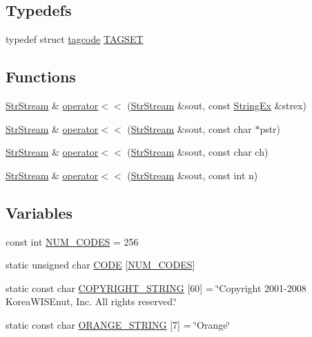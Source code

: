 \subsection*{Typedefs}
\begin{CompactItemize}
\item 
typedef struct \hyperlink{structkmaOrange_1_1tagcode}{tagcode} \hyperlink{namespacekmaOrange_230797a4305d0e6ffe336733f420995a}{TAGSET}
\end{CompactItemize}
\subsection*{Functions}
\begin{CompactItemize}
\item 
\hyperlink{classkmaOrange_1_1StrStream}{StrStream} \& \hyperlink{namespacekmaOrange_eaaf55ae03c3fd6d11fbbd9dec9f8745}{operator$<$$<$} (\hyperlink{classkmaOrange_1_1StrStream}{StrStream} \&sout, const \hyperlink{classStringEx}{StringEx} \&strex)
\item 
\hyperlink{classkmaOrange_1_1StrStream}{StrStream} \& \hyperlink{namespacekmaOrange_0b9aa2b83b5581803669bcb812a5531a}{operator$<$$<$} (\hyperlink{classkmaOrange_1_1StrStream}{StrStream} \&sout, const char $\ast$pstr)
\item 
\hyperlink{classkmaOrange_1_1StrStream}{StrStream} \& \hyperlink{namespacekmaOrange_3ef646cb3fe8b1b3f864a03226c55706}{operator$<$$<$} (\hyperlink{classkmaOrange_1_1StrStream}{StrStream} \&sout, const char ch)
\item 
\hyperlink{classkmaOrange_1_1StrStream}{StrStream} \& \hyperlink{namespacekmaOrange_008d16bca4a1401a4a101eef0ca283a1}{operator$<$$<$} (\hyperlink{classkmaOrange_1_1StrStream}{StrStream} \&sout, const int n)
\end{CompactItemize}
\subsection*{Variables}
\begin{CompactItemize}
\item 
const int \hyperlink{namespacekmaOrange_59d9d6af392d4b3c47dd7edf4bf78818}{NUM\_\-CODES} = 256
\item 
static unsigned char \hyperlink{namespacekmaOrange_50d4eae59f79db6fa6e1a81992889687}{CODE} \mbox{[}\hyperlink{namespacekmaOrange_59d9d6af392d4b3c47dd7edf4bf78818}{NUM\_\-CODES}\mbox{]}
\item 
static const char \hyperlink{namespacekmaOrange_e637169c5121cccbf64b380a74691660}{COPYRIGHT\_\-STRING} \mbox{[}60\mbox{]} = \char`\"{}Copyright 2001-2008 KoreaWISEnut, Inc. All rights reserved.\char`\"{}
\item 
static const char \hyperlink{namespacekmaOrange_cef08b622a58aea82551e96b4d1dec5c}{ORANGE\_\-STRING} \mbox{[}7\mbox{]} = \char`\"{}Orange\char`\"{}
\end{CompactItemize}


